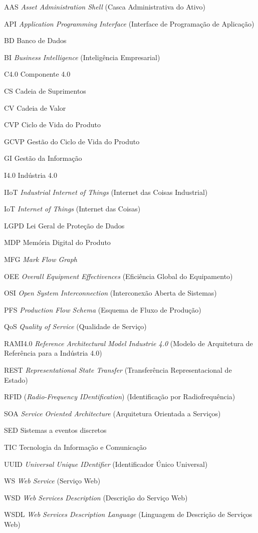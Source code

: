 \begin{siglas}
	\item[AAS] \textit{Asset Administration Shell} (Casca Administrativa do Ativo)
	\item[API] \textit{Application Programming Interface} (Interface de Programação de Aplicação)
	\item[BD] Banco de Dados
	\item[BI] \textit{Business Intelligence} (Inteligência Empresarial)
	\item[C4.0] Componente 4.0
	\item[CS] Cadeia de Suprimentos
	\item[CV] Cadeia de Valor
	\item[CVP] Ciclo de Vida do Produto
	\item[GCVP] Gestão do Ciclo de Vida do Produto
	\item[GI] Gestão da Informação
	\item[I4.0] Indústria 4.0
	\item[IIoT] \textit{Industrial Internet of Things} (Internet das Coisas Industrial)
	\item[IoT] \textit{Internet of Things} (Internet das Coisas)
	\item[LGPD] Lei Geral de Proteção de Dados
	\item[MDP] Memória Digital do Produto
	\item[MFG] \textit{Mark Flow Graph}
	\item[OEE] \textit{Overall Equipment Effectivences} (Eficiência Global do Equipamento)
	\item[OSI] \textit{Open System Interconnection} (Interconexão Aberta de Sistemas)
	\item[PFS] \textit{Production Flow Schema} (Esquema de Fluxo de Produção)
	\item[QoS] \textit{Quality of Service} (Qualidade de Serviço)
	\item[RAMI4.0] \textit{Reference Architectural Model Industrie 4.0} (Modelo de Arquitetura de Referência para a Indústria 4.0)
	\item[REST] \textit{Representational State Transfer} (Transferência Representacional de Estado)
	\item[RFID] (\textit{Radio-Frequency IDentification}) (Identificação por Radiofrequência)
	\item[SOA] \textit{Service Oriented Architecture} (Arquitetura Orientada a Serviços)
	\item[SED] Sistemas a eventos discretos
	\item[TIC] Tecnologia da Informação e Comunicação
  	\item[UUID] \textit{Universal Unique IDentifier} (Identificador Único Universal)
  	\item[WS] \textit{Web Service} (Serviço Web)
  	\item[WSD] \textit{Web Services Description} (Descrição do Serviço Web)
  	\item[WSDL] \textit{Web Services Description Language} (Linguagem de Descrição de Serviços Web)
\end{siglas}

\tableofcontents*
\cleardoublepage
